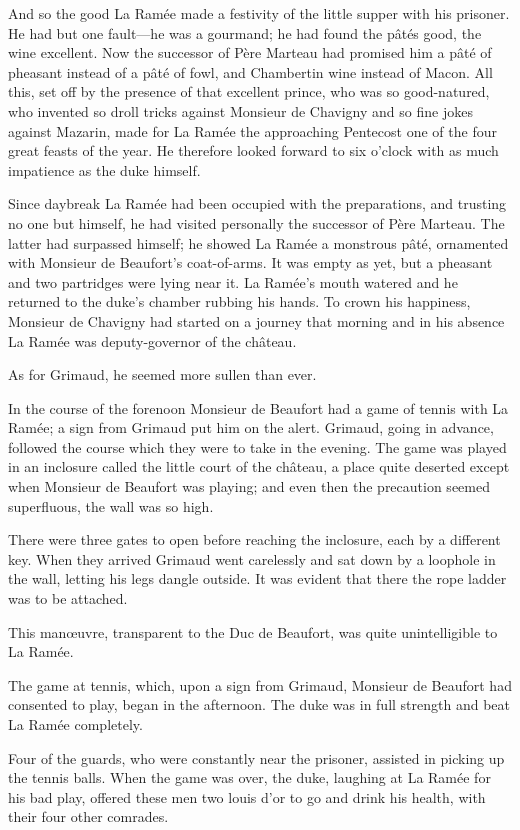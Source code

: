 And so the good La Ramée made a festivity of the little supper with his prisoner. He had but one fault—he was a gourmand; he had found the pâtés good, the wine excellent. Now the successor of Père Marteau had promised him a pâté of pheasant instead of a pâté of fowl, and Chambertin wine instead of Macon. All this, set off by the presence of that excellent prince, who was so good-natured, who invented so droll tricks against Monsieur de Chavigny and so fine jokes against Mazarin, made for La Ramée the approaching Pentecost one of the four great feasts of the year. He therefore looked forward to six o'clock with as much impatience as the duke himself.

Since daybreak La Ramée had been occupied with the preparations, and trusting no one but himself, he had visited personally the successor of Père Marteau. The latter had surpassed himself; he showed La Ramée a monstrous pâté, ornamented with Monsieur de Beaufort's coat-of-arms. It was empty as yet, but a pheasant and two partridges were lying near it. La Ramée's mouth watered and he returned to the duke's chamber rubbing his hands. To crown his happiness, Monsieur de Chavigny had started on a journey that morning and in his absence La Ramée was deputy-governor of the château.

As for Grimaud, he seemed more sullen than ever.

In the course of the forenoon Monsieur de Beaufort had a game of tennis with La Ramée; a sign from Grimaud put him on the alert. Grimaud, going in advance, followed the course which they were to take in the evening. The game was played in an inclosure called the little court of the château, a place quite deserted except when Monsieur de Beaufort was playing; and even then the precaution seemed superfluous, the wall was so high.

There were three gates to open before reaching the inclosure, each by a different key. When they arrived Grimaud went carelessly and sat down by a loophole in the wall, letting his legs dangle outside. It was evident that there the rope ladder was to be attached.

This manœuvre, transparent to the Duc de Beaufort, was quite unintelligible to La Ramée.

The game at tennis, which, upon a sign from Grimaud, Monsieur de Beaufort had consented to play, began in the afternoon. The duke was in full strength and beat La Ramée completely.

Four of the guards, who were constantly near the prisoner, assisted in picking up the tennis balls. When the game was over, the duke, laughing at La Ramée for his bad play, offered these men two louis d'or to go and drink his health, with their four other comrades.

